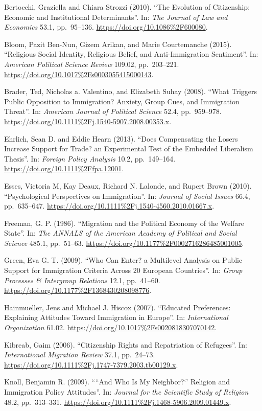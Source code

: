 \documentclass[10pt,]{article}
\begin{document}
Bertocchi, Graziella and Chiara Strozzi (2010). ``The Evolution of
Citizenship: Economic and Institutional Determinants''. In:
\emph{The Journal of Law and Economics} 53.1, pp.~95--136.
\url{https://doi.org/10.1086\%2F600080}.

Bloom, Pazit Ben-Nun, Gizem Arikan, and Marie Courtemanche (2015).
``Religious Social Identity, Religious Belief, and Anti-Immigration
Sentiment''. In: \emph{American Political Science Review} 109.02,
pp.~203--221. \url{https://doi.org/10.1017\%2Fs0003055415000143}.

Brader, Ted, Nicholas a. Valentino, and Elizabeth Suhay (2008). ``What
Triggers Public Opposition to Immigration? Anxiety, Group Cues, and
Immigration Threat''. In: \emph{American Journal of Political Science}
52.4, pp.~959--978.
\url{https://doi.org/10.1111\%2Fj.1540-5907.2008.00353.x}.

Ehrlich, Sean D. and Eddie Hearn (2013). ``Does Compensating the Losers
Increase Support for Trade? an Experimental Test of the Embedded
Liberalism Thesis''. In: \emph{Foreign Policy Analysis} 10.2,
pp.~149--164. \url{https://doi.org/10.1111\%2Ffpa.12001}.

Esses, Victoria M, Kay Deaux, Richard N. Lalonde, and Rupert Brown
(2010). ``Psychological Perspectives on Immigration''. In:
\emph{Journal of Social Issues} 66.4, pp.~635--647.
\url{https://doi.org/10.1111\%2Fj.1540-4560.2010.01667.x}.

Freeman, G. P. (1986). ``Migration and the Political Economy of the
Welfare State''. In:
\emph{The ANNALS of the American Academy of Political and Social Science}
485.1, pp.~51--63. \url{https://doi.org/10.1177\%2F0002716286485001005}.

Green, Eva G. T. (2009). ``Who Can Enter? a Multilevel Analysis on
Public Support for Immigration Criteria Across 20 European Countries''.
In: \emph{Group Processes \& Intergroup Relations} 12.1, pp.~41--60.
\url{https://doi.org/10.1177\%2F1368430208098776}.

Hainmueller, Jens and Michael J. Hiscox (2007). ``Educated Preferences:
Explaining Attitudes Toward Immigration in Europe''. In:
\emph{International Organization} 61.02.
\url{https://doi.org/10.1017\%2Fs0020818307070142}.

Kibreab, Gaim (2006). ``Citizenship Rights and Repatriation of
Refugees''. In: \emph{International Migration Review} 37.1, pp.~24--73.
\url{https://doi.org/10.1111\%2Fj.1747-7379.2003.tb00129.x}.

Knoll, Benjamin R. (2009). ````And Who Is My Neighbor?`' Religion and
Immigration Policy Attitudes''. In:
\emph{Journal for the Scientific Study of Religion} 48.2, pp.~313--331.
\url{https://doi.org/10.1111\%2Fj.1468-5906.2009.01449.x}.
\end{document}
